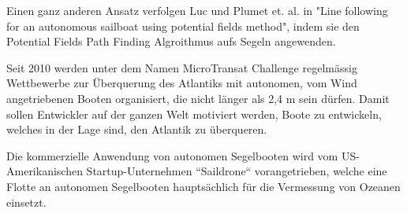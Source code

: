 Einen ganz anderen Ansatz verfolgen Luc und Plumet et. al. in "Line following for an autonomous sailboat using potential fields method", indem sie den Potential Fields Path Finding Algroithmus aufs Segeln angewenden. \cite{inproceedings}

Seit 2010 werden unter dem Namen MicroTransat Challenge regelmässig Wettbewerbe zur Überquerung des Atlantiks mit autonomen, vom Wind angetriebenen Booten organisiert, die nicht länger als 2,4 m sein dürfen. 
Damit sollen Entwickler auf der ganzen Welt motiviert werden, Boote zu entwickeln, welches in der Lage sind, den Atlantik zu überqueren. \cite{noauthor_microtransat_nodate}

Die kommerzielle Anwendung von autonomen Segelbooten wird vom US-Amerikanischen 
Startup-Unternehmen ``Saildrone`` vorangetrieben, welche eine Flotte an autonomen Segelbooten hauptsächlich für die Vermessung von Ozeanen einsetzt. \cite{noauthor_saildrone_nodate}


























